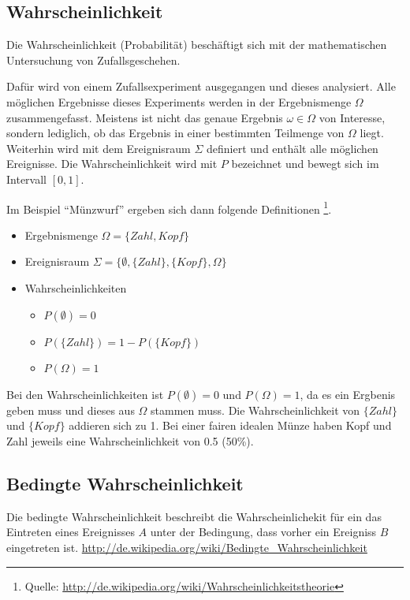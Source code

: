 \subsection{Wahrscheinlichkeit}
\label{sec:prop}
Die Wahrscheinlichkeit (Probabilität) beschäftigt sich mit der mathematischen Untersuchung von Zufallsgeschehen. 

Dafür wird von einem Zufallsexperiment ausgegangen und dieses analysiert. Alle möglichen Ergebnisse dieses Experiments werden in der Ergebnismenge $\Omega$ zusammengefasst. Meistens ist nicht das genaue Ergebnis $\omega \in \Omega$ von Interesse, sondern lediglich, ob das Ergebnis in einer bestimmten Teilmenge von $\Omega$ liegt. Weiterhin wird mit dem Ereignisraum $\Sigma$ definiert und enthält alle möglichen Ereignisse. Die Wahrscheinlichkeit wird mit $P$ bezeichnet und bewegt sich im Intervall $[0, 1]$. 

Im Beispiel ``Münzwurf'' ergeben sich dann folgende Definitionen \footnote{Quelle: \url{http://de.wikipedia.org/wiki/Wahrscheinlichkeitstheorie}}.

\begin{itemize}
\item Ergebnismenge $\Omega = \{Zahl, Kopf\}$
\item Ereignisraum $\Sigma = \{\emptyset, \{Zahl\}, \{Kopf\}, \Omega\}$
\item Wahrscheinlichkeiten
	\begin{itemize}
	\item $P(\emptyset) = 0$
	\item $P(\{Zahl\}) = 1 - P(\{Kopf\})$
	\item $P(\Omega) = 1$
	\end{itemize}
\end{itemize}
Bei den Wahrscheinlichkeiten ist $P(\emptyset) = 0$ und $P(\Omega) = 1$, da es ein Ergbenis geben muss und dieses aus $\Omega$ stammen muss. Die Wahrscheinlichkeit von $\{Zahl\}$ und $\{Kopf\}$ addieren sich zu 1. Bei einer fairen idealen Münze haben Kopf und Zahl jeweils eine Wahrscheinlichkeit von 0.5 (50\%).


\subsection{Bedingte Wahrscheinlichkeit}
\label{sec:condprop}
Die bedingte Wahrscheinlichkeit beschreibt die Wahrscheinlichekit für ein das Eintreten eines Ereignisses $A$ unter der Bedingung, dass vorher ein Ereigniss $B$ eingetreten ist.
\url{http://de.wikipedia.org/wiki/Bedingte_Wahrscheinlichkeit}




